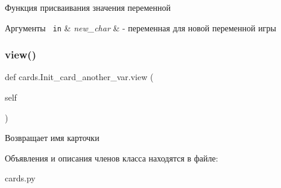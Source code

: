 Функция присваивания значения переменной 


\begin{DoxyParams}[1]{Аргументы}
\mbox{\texttt{ in}}  & {\em new\+\_\+char} & -\/ переменная для новой переменной игры \\
\hline
\end{DoxyParams}
\mbox{\label{classcards_1_1_init__card__another__var_a0481b3f8d1e7152c4a93279b6de5baf9}} 
\subsubsection{\texorpdfstring{view()}{view()}}
{\footnotesize\ttfamily def cards.\+Init\+\_\+card\+\_\+another\+\_\+var.\+view (\begin{DoxyParamCaption}\item[{}]{self }\end{DoxyParamCaption})}



Возвращает имя карточки 



Объявления и описания членов класса находятся в файле\+:\begin{DoxyCompactItemize}
\item 
cards.\+py\end{DoxyCompactItemize}

